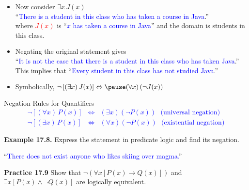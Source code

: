\documentclass[aspectratio=169]{beamer}
\providecommand{\Blue}[1]{\textcolor{blue}{#1}}
\providecommand{\Red}[1]{\textcolor{red}{#1}}
\begin{document}
\begin{frame}[plain]{}
  
  \begin{itemize}
   \item Now consider $\exists x\, J(x)$\\
     ``\Blue{There is a student in this class who has taken a course in Java}.''\\
      where \Red{$J(x)$} is ``\Blue{$x$ has taken a course in Java}'' and
      the domain is students in this class.
    \item  Negating the original statement gives  \pause \\
     ``\Blue{It is not the case that there is a student in this class who has taken Java}.''\\
    This implies that ``\Blue{Every student in this class has not studied Java}.''
    \item Symbolically, \Blue{$\neg\left[ (\exists x)\, J(x)\right] \Leftrightarrow \pause 
      (\forall x)\, (\neg J(x))$} 
 \end{itemize}
\end{frame}

\begin{frame}[plain]{Negation Rules  for Quantifiers}
   \Blue{
   \begin{eqnarray*}
     \neg\left[ (\forall x)\, P(x)\right] &\Leftrightarrow & (\exists x) (\neg P(x))\ \ \ \mbox{(universal negation)} \\
     \neg\left[ (\exists x)\, P(x) \right] &\Leftrightarrow & (\forall x) (\neg P(x)) \ \ \ \mbox{(existential negation)}
   \end{eqnarray*}
   }
   
   \medskip
   
 {\bf Example 17.8.} Express the statement in predicate logic and find its negation.
      \begin{center}
         ``\Blue{There does not exist anyone who likes skiing over magma.}''   
      \end{center}
 \medskip
 \pause
 
{\bf Practice 17.9} 
  Show that $\neg\left(\forall x [P(x)\rightarrow Q(x)]\right)$ and
    $\exists x [P(x)\wedge \neg Q(x)]$ are logically equivalent. %
 
\end{frame}
\end{document}
